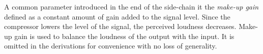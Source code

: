\documentclass[../main2.tex]{subfiles}
\begin{document}
 A common parameter introduced in the end of the side-chain it the \emph{make-up gain} defined as a constant amount of gain added to the signal level. Since the compressor lowers the level of the signal, the perceived loudness decreases. Make-up gain is used to balance the loudness of the output with the input. It is omitted in the derivations for convenience with no loss of generality.
\end{document}
